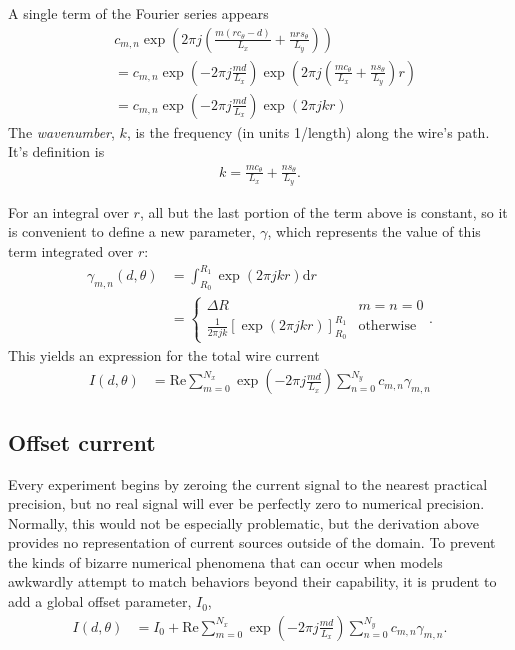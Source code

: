 \documentclass{article}
\def\d{\mathrm{d}}
\def\real{\mathrm{Re}}
\begin{document}
A single term of the Fourier series appears
\begin{align*}
&c_{m,n} \exp\left(2\pi j \left( \frac{m(r c_\theta - d)}{L_x} + \frac{n r s_\theta}{L_y} \right)\right)\\
&= c_{m,n} \exp\left(-2\pi j \frac{md}{L_x} \right) \exp\left(2\pi j \left( \frac{m c_\theta}{L_x} + \frac{n s_\theta}{L_y} \right) r\right)\\
&= c_{m,n} \exp\left(-2\pi j \frac{md}{L_x} \right) \exp\left(2\pi j k r \right)
\end{align*}
The \emph{wavenumber}, $k$, is the frequency (in units 1/length) along the wire's path.  It's definition is
\begin{align}
k = \frac{m c_\theta}{L_x} + \frac{n s_\theta}{L_y}.
\end{align}

For an integral over $r$, all but the last portion of the term above is constant, so it is convenient to define a new parameter, $\gamma$, which represents the value of this term integrated over $r$:
\begin{align}
\gamma_{m,n}(d,\theta) &= \int_{R_0}^{R_1} \exp\left(2\pi j k r \right) \d r \nonumber\\
 &= \left\{\begin{array}{c|l}
 \Delta R & m = n = 0\\
 \frac{1}{2\pi j k}\left[\exp\left(2\pi j k r \right)\right]^{R_1}_{R_0} & \mathrm{otherwise}
\end{array}
\right. .
\end{align}
This yields an expression for the total wire current
\begin{align}
I(d,\theta) &= \real \sum_{m=0}^{N_x} \exp\left(-2\pi j \frac{md}{L_x} \right) \sum_{n=0}^{N_y} c_{m,n} \gamma_{m,n} 
\end{align}

\subsection{Offset current}

Every experiment begins by zeroing the current signal to the nearest practical precision, but no real signal will ever be perfectly zero to numerical precision.  Normally, this would not be especially problematic, but the derivation above provides no representation of current sources outside of the domain.  To prevent the kinds of bizarre numerical phenomena that can occur when models awkwardly attempt to match behaviors beyond their capability, it is prudent to add a global offset parameter, $I_0$,  
\begin{align}
I(d,\theta) &= I_0 + \real \sum_{m=0}^{N_x} \exp\left(-2\pi j \frac{md}{L_x} \right) \sum_{n=0}^{N_y} c_{m,n}\gamma_{m,n}\label{eqn:I}.
\end{align}
\end{document}
